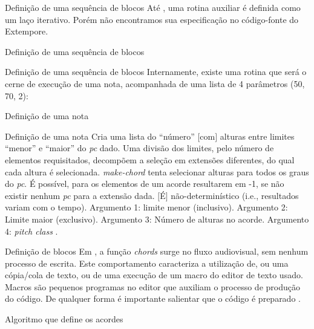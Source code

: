 \documentclass[aspectratio=169]{beamer}
\begin{document}
\begin{frame}{Definição de uma sequência de blocos}
Até , uma rotina auxiliar é definida como um laço iterativo. Porém não encontramos sua especificação no código-fonte do Extempore.
\end{frame}

\begin{frame}{Definição de uma sequência de blocos}
\sorensentres
\end{frame}

\begin{frame}{Definição de uma sequência de blocos}
Internamente, existe uma rotina que será o cerne de execução de uma nota, acompanhada de uma lista de 4 parâmetros (50, 70, 2):
\end{frame}

\begin{frame}{Definição de uma nota}
 \sorensenquatro
\end{frame}

\begin{frame}{Definição de uma nota}
Cria uma lista do ``número'' $[$com$]$ alturas entre limites ``menor'' e ``maior'' do \emph{pc} dado. Uma divisão dos limites, pelo número de elementos requisitados, decompõem a seleção em extensões diferentes, do qual cada altura é selecionada. \emph{make-chord} tenta selecionar alturas para todos os graus do \emph{pc}. É possível, para  os elementos de um acorde resultarem em -1, se não existir nenhum \emph{pc} para a extensão dada. $[$É$]$ não-determinístico (i.e., resultados variam com o tempo). Argumento 1: limite menor (inclusivo). Argumento 2: Limite maior (exclusivo). Argumento 3: Número de alturas no acorde. Argumento 4: \emph{pitch class} \cite{swift_playingII_2012}.
\end{frame}

\begin{frame}{Definição de blocos}
Em , a função \emph{chords} surge no fluxo audiovisual, sem nenhum processo de escrita. Este comportamento caracteriza a utilização de, ou uma cópia/cola de texto, ou de uma execução de um macro do editor de texto usado. Macros são pequenos programas no editor que auxiliam o processo de produção do código. De qualquer forma é importante salientar que o código é preparado \cite{sorensen_youtube_2014}.
\end{frame}

\begin{frame}{Algoritmo que define os acordes}
\sorensencinco
\end{frame}
\end{document}
